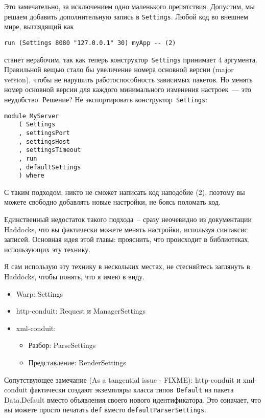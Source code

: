 Это замечательно, за исключением одно маленького
препятствия. Допустим, мы решаем добавить дополнительную запись в
\lstinline!Settings!. Любой код во внешнем мире, выглядящий как
\begin{lstlisting}
run (Settings 8080 "127.0.0.1" 30) myApp -- (2)
\end{lstlisting}
станет нерабочим, так как теперь конструктор~\lstinline!Settings!
принимает 4 аргумента. Правильной вещью стало бы увеличение номера
основной версии (major version), чтобы не нарушить работоспособность
зависимых пакетов. Но менять номер основной версии для каждого
минимального изменения настроек~--- это неудобство. Решение? Не
экспортировать конструктор~\lstinline!Settings!:
\begin{lstlisting}
module MyServer
    ( Settings
    , settingsPort
    , settingsHost
    , settingsTimeout
    , run
    , defaultSettings
    ) where
\end{lstlisting}

С таким подходом, никто не сможет написать код наподобие (2), поэтому
вы можете свободно добавлять новые настройки, не боясь поломать код.

Единственный недостаток такого подхода~-- сразу неочевидно из
документации Haddocks, что вы фактически можете менять настройки,
используя синтаксис записей. Основная идея этой главы: прояснить, что
происходит в библиотеках, использующих эту технику.

Я сам использую эту технику в нескольких местах, не стесняйтесь
заглянуть в Haddocks, чтобы понять, что я имею в виду.
\begin{itemize}
\item Warp: Settings
\item http-conduit: Request и ManagerSettings
\item xml-conduit:
  \begin{itemize}
  \item Разбор: ParseSettings
  \item Представление: RenderSettings
  \end{itemize}
\end{itemize}

Сопутствующее замечание (As a tangential issue - FIXME): http-conduit
и xml-conduit фактически создают экземпляры класса
типов~\lstinline!Default! из пакета Data.Default вместо объявления
своего нового идентификатора. Это означает, что вы можете просто
печатать \lstinline!def! вместо \lstinline!defaultParserSettings!.
